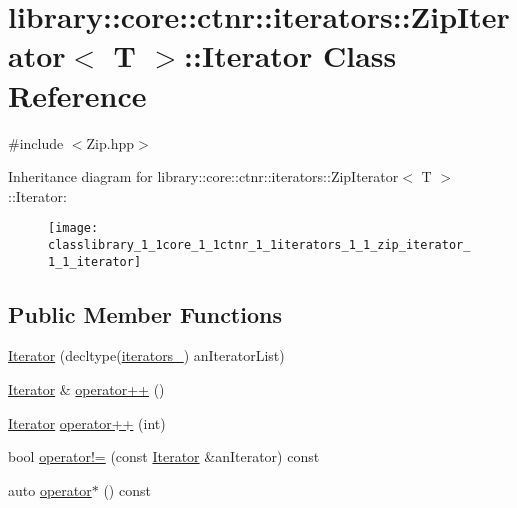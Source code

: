 \hypertarget{classlibrary_1_1core_1_1ctnr_1_1iterators_1_1_zip_iterator_1_1_iterator}{}\section{library\+:\+:core\+:\+:ctnr\+:\+:iterators\+:\+:Zip\+Iterator$<$ T $>$\+:\+:Iterator Class Reference}
\label{classlibrary_1_1core_1_1ctnr_1_1iterators_1_1_zip_iterator_1_1_iterator}


{\ttfamily \#include $<$Zip.\+hpp$>$}

Inheritance diagram for library\+:\+:core\+:\+:ctnr\+:\+:iterators\+:\+:Zip\+Iterator$<$ T $>$\+:\+:Iterator\+:\begin{figure}[H]
\begin{center}
\leavevmode
\texttt{[image: classlibrary\_1\_1core\_1\_1ctnr\_1\_1iterators\_1\_1\_zip\_iterator\_1\_1\_iterator]}
\end{center}
\end{figure}
\subsection*{Public Member Functions}
\begin{DoxyCompactItemize}
\item 
\hyperlink{classlibrary_1_1core_1_1ctnr_1_1iterators_1_1_zip_iterator_1_1_iterator_ab93e780bb41bdb0fbce8e852138051a4}{Iterator} (decltype(\hyperlink{classlibrary_1_1core_1_1ctnr_1_1iterators_1_1_zip_iterator_1_1_iterator_a37c838a652996c4a8d140f1cc3804e4a}{iterators\+\_\+}) an\+Iterator\+List)
\item 
\hyperlink{classlibrary_1_1core_1_1ctnr_1_1iterators_1_1_zip_iterator_1_1_iterator}{Iterator} \& \hyperlink{classlibrary_1_1core_1_1ctnr_1_1iterators_1_1_zip_iterator_1_1_iterator_ab41c609c9afe7e62fe6e4cceaa709771}{operator++} ()
\item 
\hyperlink{classlibrary_1_1core_1_1ctnr_1_1iterators_1_1_zip_iterator_1_1_iterator}{Iterator} \hyperlink{classlibrary_1_1core_1_1ctnr_1_1iterators_1_1_zip_iterator_1_1_iterator_abd2db3105f0aeedec986c6db965ba16f}{operator++} (int)
\item 
bool \hyperlink{classlibrary_1_1core_1_1ctnr_1_1iterators_1_1_zip_iterator_1_1_iterator_ae3e898d5e9a5f0aa7f1f076de6af8063}{operator!=} (const \hyperlink{classlibrary_1_1core_1_1ctnr_1_1iterators_1_1_zip_iterator_1_1_iterator}{Iterator} \&an\+Iterator) const
\item 
auto \hyperlink{classlibrary_1_1core_1_1ctnr_1_1iterators_1_1_zip_iterator_1_1_iterator_a34082110fb060868a9e15bc1b5c475a1}{operator$\ast$} () const
\end{DoxyCompactItemize}
